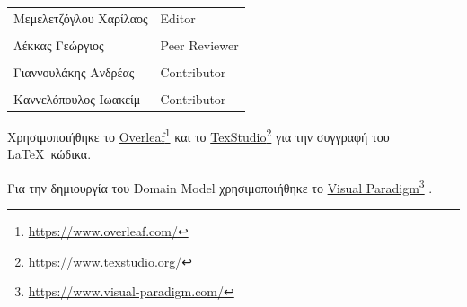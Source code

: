 \documentclass{../ol-softwaremanual}
\newcommand{\doclink}[2]{\href{#1}{#2}\footnote{\url{#1}}}
\begin{document}
	
	\vspace{20pt}
	
	\begin{table}[htbp!]
		\begin{tabular}{ll}
			Μεμελετζόγλου Χαρίλαος & \en Editor \\
			\\ Λέκκας Γεώργιος      &   \en  Peer Reviewer \\
			\\ Γιαννουλάκης Ανδρέας & \en Contributor \\
			\\ Καννελόπουλος Ιωακείμ & \en Contributor \\ 
		\end{tabular}
	\end{table}
	
	
	
	
	\vspace{20pt}
	\flushleft
	Χρησιμοποιήθηκε το \en \doclink{https://www.overleaf.com/}{Overleaf} \gr και το \en \doclink{https://www.texstudio.org/}{TexStudio} \gr για την συγγραφή του \LaTeX\ κώδικα. \break
	
	Για την δημιουργία του \en Domain Model \gr χρησιμοποιήθηκε το \en \doclink{https://www.visual-paradigm.com/}{Visual Paradigm} \gr .
	
	\newpage
	
	
\end{document}
